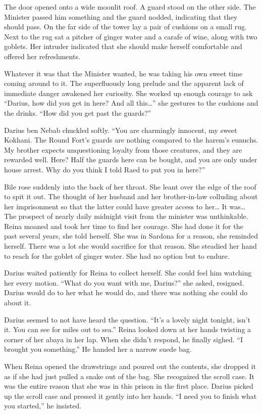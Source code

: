 \documentclass{article}
\begin{document}
	The door opened onto a wide moonlit roof. A guard stood on the other side. The Minister passed him something and the guard nodded, indicating that they should pass.  On the far side of the tower lay a pair of cushions on a small rug. Next to the rug sat a pitcher of ginger water and a carafe of wine, along with two goblets. Her intruder indicated that she should make herself comfortable and offered her refreshments. 
	
	Whatever it was that the Minister wanted, he was taking his own sweet time coming around to it. The superfluously long prelude and the apparent lack of immediate danger awakened her curiosity. She worked up enough courage to ask “Darius, how did you get in here? And all this…” she gestures to the cushions and the drinks. “How did you get past the guards?”
	
	Darius ben Nebab chuckled softly. “You are charmingly innocent, my sweet Kokhani. The Round Fort’s guards are nothing compared to the harem’s eunuchs. My brother expects unquestioning loyalty from those creatures, and they are rewarded well. Here? Half the guards here can be bought, and you are only under house arrest. Why do you think I told Raed to put you in here?” 
	
	Bile rose suddenly into the back of her throat. She leant over the edge of the roof to spit it out. The thought of her husband and her brother-in-law colluding about her imprisonment so that the latter could have greater access to her… It was… The prospect of nearly daily midnight visit from the minister was unthinkable. Reina moaned and took her time to find her courage. She had done it for the past several years, she told herself. She was in Sardona for a reason, she reminded herself. There was a lot she would sacrifice for that reason. She steadied her hand to reach for the goblet of ginger water. She had no option but to endure. 
	
	Darius waited patiently for Reina to collect herself. She could feel him watching her every motion. “What do you want with me, Darius?” she asked, resigned. Darius would do to her what he would do, and there was nothing she could do about it.
	
	Darius seemed to not have heard the question. “It’s a lovely night tonight, isn’t it. You can see for miles out to sea.” Reina looked down at her hands twisting a corner of her abaya in her lap. When she didn’t respond, he finally sighed. “I brought you something.” He handed her a narrow suede bag. 
	
	When Reina opened the drawstrings and poured out the contents, she dropped it as if she had just pulled a snake out of the bag. She recognized the scroll case. It was the entire reason that she was in this prison in the first place. Darius picked up the scroll case and pressed it gently into her hands. “I need you to finish what you started,” he insisted.
	
\end{document}
